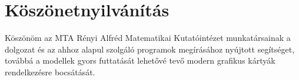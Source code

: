 \chapter*{Köszönetnyilvánítás}

Köszönöm az MTA Rényi Alfréd Matematikai Kutatóintézet munkatársainak a dolgozat és az ahhoz alapul szolgáló programok megírásához nyújtott segítséget, továbbá a modellek gyors futtatását lehetővé tevő modern grafikus kártyák rendelkezésre bocsátását.